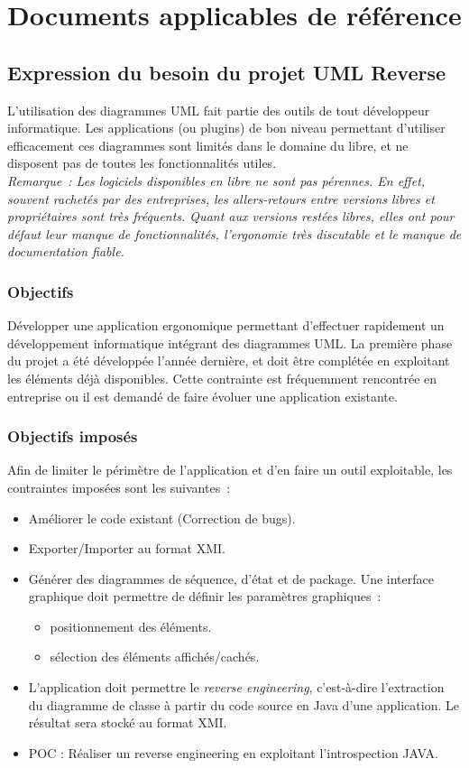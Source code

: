 \documentclass[hidelinks, 10pt,a4paper]{article}
\begin{document}
\section{Documents applicables de référence}
\subsection{Expression du besoin du projet UML Reverse}
L’utilisation des diagrammes UML fait partie des outils de tout développeur informatique. Les applications (ou plugins) de bon niveau permettant d’utiliser efficacement ces diagrammes sont limités dans le domaine du libre, et ne disposent pas de toutes les fonctionnalités utiles.\\
\emph{Remarque~: Les logiciels disponibles en libre ne sont pas pérennes. En effet, souvent rachetés par des entreprises, les allers-retours entre versions libres et propriétaires sont très fréquents. Quant aux versions restées libres, elles ont pour défaut leur manque de fonctionnalités, l’ergonomie très discutable et le manque de documentation fiable.}
\subsubsection*{Objectifs}
Développer une application ergonomique permettant d'effectuer rapidement un développement informatique intégrant des diagrammes UML. La première phase du projet a été développée l'année dernière, et doit être complétée en exploitant les éléments déjà disponibles. Cette contrainte est fréquemment rencontrée en entreprise ou il est demandé de faire évoluer une application existante.
\subsubsection*{Objectifs imposés}
Afin de limiter le périmètre de l’application et d’en faire un outil exploitable, les contraintes imposées sont les suivantes~:
\begin{itemize}
\item Améliorer le code existant (Correction de bugs).
\item Exporter/Importer au format XMI.
\item Générer des diagrammes de séquence, d'état et de package.
Une interface graphique doit permettre de définir les paramètres graphiques~:
\begin{itemize}
\item positionnement des éléments.
\item sélection des éléments affichés/cachés.
\end{itemize}
\item L’application doit permettre le \textit{reverse engineering}, c’est-à-dire l’extraction du diagramme de classe à partir du code source en Java d’une application. Le résultat sera stocké au format XMI.
\item POC : Réaliser un reverse engineering en exploitant l'introspection JAVA.
\end{itemize}
\end{document}
